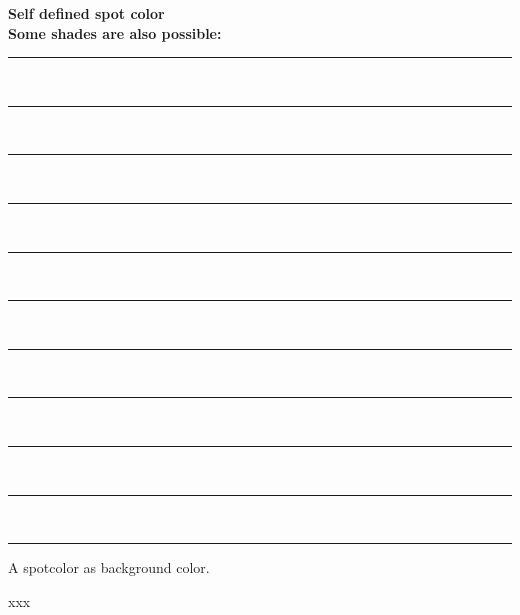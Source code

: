 \documentclass{article}
\begin{document}
	\bf\Huge Self defined spot color\\
	Some shades are also possible:\\
	\rule{1cm}{1cm}\\
	\rule{1cm}{1cm}\\
	\rule{1cm}{1cm}\\
	\rule{1cm}{1cm}\\
	\rule{1cm}{1cm}\\
	\rule{1cm}{1cm}\\
	\rule{1cm}{1cm}\\
	\rule{1cm}{1cm}\\
	\rule{1cm}{1cm}\\
	\rule{1cm}{1cm}\\
	\rule{1cm}{1cm}

	\clearpage
	\pagecolor{Spots}
	A spotcolor as background color.

	\clearpage
	\pagecolor{white}
	\colorbox{Spots}{xxx}
\end{document}

